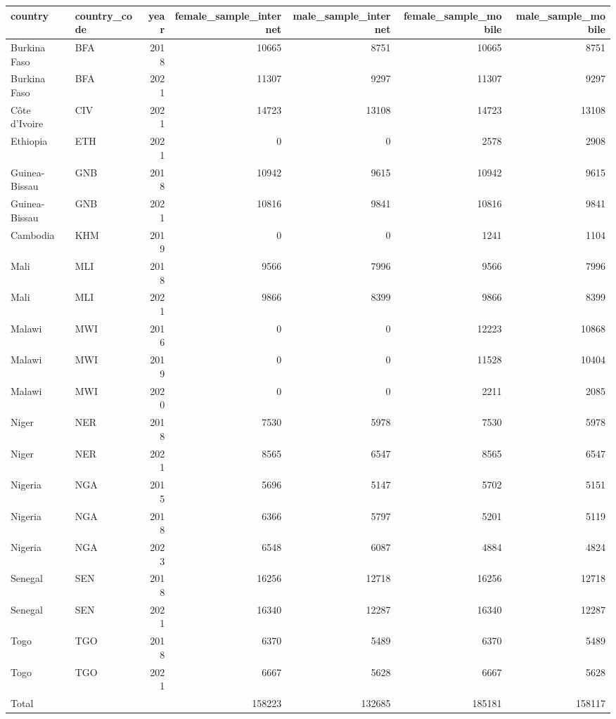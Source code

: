 \begin{table}[ht]
\centering
\begin{tabular}{llrrrrr}
  \hline
country & country\_code & year & female\_sample\_internet & male\_sample\_internet & female\_sample\_mobile & male\_sample\_mobile \\ 
  \hline
Burkina Faso & BFA & 2018 & 10665 & 8751 & 10665 & 8751 \\ 
  Burkina Faso & BFA & 2021 & 11307 & 9297 & 11307 & 9297 \\ 
  Côte d’Ivoire & CIV & 2021 & 14723 & 13108 & 14723 & 13108 \\ 
  Ethiopia & ETH & 2021 & 0 & 0 & 2578 & 2908 \\ 
  Guinea-Bissau & GNB & 2018 & 10942 & 9615 & 10942 & 9615 \\ 
  Guinea-Bissau & GNB & 2021 & 10816 & 9841 & 10816 & 9841 \\ 
  Cambodia & KHM & 2019 & 0 & 0 & 1241 & 1104 \\ 
  Mali & MLI & 2018 & 9566 & 7996 & 9566 & 7996 \\ 
  Mali & MLI & 2021 & 9866 & 8399 & 9866 & 8399 \\ 
  Malawi & MWI & 2016 & 0 & 0 & 12223 & 10868 \\ 
  Malawi & MWI & 2019 & 0 & 0 & 11528 & 10404 \\ 
  Malawi & MWI & 2020 & 0 & 0 & 2211 & 2085 \\ 
  Niger & NER & 2018 & 7530 & 5978 & 7530 & 5978 \\ 
  Niger & NER & 2021 & 8565 & 6547 & 8565 & 6547 \\ 
  Nigeria & NGA & 2015 & 5696 & 5147 & 5702 & 5151 \\ 
  Nigeria & NGA & 2018 & 6366 & 5797 & 5201 & 5119 \\ 
  Nigeria & NGA & 2023 & 6548 & 6087 & 4884 & 4824 \\ 
  Senegal & SEN & 2018 & 16256 & 12718 & 16256 & 12718 \\ 
  Senegal & SEN & 2021 & 16340 & 12287 & 16340 & 12287 \\ 
  Togo & TGO & 2018 & 6370 & 5489 & 6370 & 5489 \\ 
  Togo & TGO & 2021 & 6667 & 5628 & 6667 & 5628 \\ 
  Total &  &  & 158223 & 132685 & 185181 & 158117 \\ 
   \hline
\end{tabular}
\end{table}
